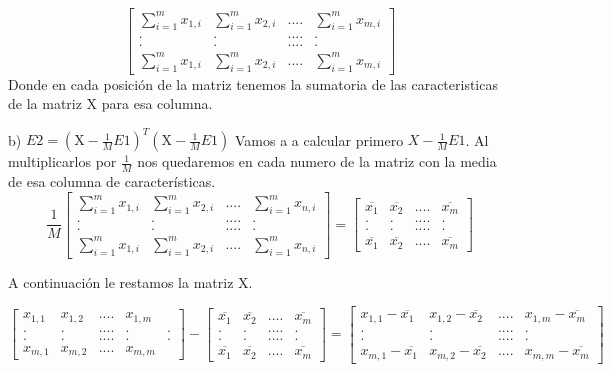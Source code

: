 \documentclass[titlepage]{article}
\begin{document}
  	\[
  	\begin{bmatrix}
  	\sum_{i=1}^{m}x_{1,i} & \sum_{i=1}^{m}x_{2,i} & .... & \sum_{i=1}^{m}x_{m,i} \\
  	. & . & .... & .\\	
  	. & . & .... & .\\	
  	\sum_{i=1}^{m}x_{1,i} & \sum_{i=1}^{m}x_{2,i} & .... & \sum_{i=1}^{m}x_{m,i}
  	\end{bmatrix}
  	\]
  	Donde en cada posición de la matriz tenemos la sumatoria de las caracteristicas de la matriz X para esa columna.

  	
  	b) $E 2=\left(\mathrm{X}-\frac{1}{M} E 1\right)^{T}\left(\mathrm{X}-\frac{1}{M} E 1\right)$
  	Vamos a a calcular primero $X-\frac{1}{M}E1$. Al multiplicarlos por $\frac{1}{M}$ nos quedaremos en cada numero de la matriz con la media de esa columna de características.
  	\[
  	\frac{1}{M}
  	\begin{bmatrix}
  	\sum_{i=1}^{m}x_{1,i} & \sum_{i=1}^{m}x_{2,i} & .... & \sum_{i=1}^{m}x_{n,i} \\
  	. & . & .... & .\\	
  	. & . & .... & .\\	
  	\sum_{i=1}^{m}x_{1,i} & \sum_{i=1}^{m}x_{2,i} & .... & \sum_{i=1}^{m}x_{n,i}
  	\end{bmatrix}
  	=
  	\begin{bmatrix}
  	 \overline{x_1} & \overline{x_2} & .... & \overline{x_m} \\
  	. & . & .... & .\\	
  	. & . & .... & .\\	
  	\overline{x_1} & \overline{x_2} & .... & \overline{x_m}
  	\end{bmatrix}
  	\]
  	
  	\newpage
  	A continuación le restamos la matriz X.
  	
  	\[
  	\begin{bmatrix}
  	x_{1,1} & x_{1,2} & .... & x_{1,m}\\
  	. & . & .... & . & .\\	
  	. & . & .... & . & .\\	
  	x_{m,1} & x_{m,2} & .... & x_{m,m} 
  	\end{bmatrix}
  	-
  	\begin{bmatrix}
  	\overline{x_1} & \overline{x_2} & .... & \overline{x_m} \\
  	. & . & .... & .\\	
  	. & . & .... & .\\	
  	\overline{x_1} & \overline{x_2} & .... & \overline{x_m}
  	\end{bmatrix}
  	=
  	\begin{bmatrix}
  	x_{1,1} - \overline{x_1} & x_{1,2}-\overline{x_2} & .... & x_{1,m} -\overline{x_m} \\
  	. & . & .... & .\\	
  	. & . & .... & .\\	
  	x_{m,1}-\overline{x_1} & x_{m,2}-\overline{x_2} & .... & x_{m,m}-\overline{x_m}
  	\end{bmatrix}  	
  	\]
  	
\end{document}
